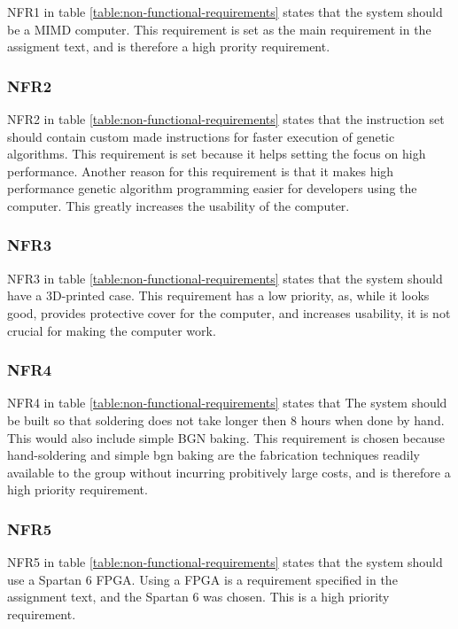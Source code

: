 NFR1 in table \vref{table:non-functional-requirements} states that the system should be a MIMD computer.
This requirement is set as the main requirement in the assigment text, and is therefore a high prority requirement.

\subsubsection{NFR2}

NFR2 in table \vref{table:non-functional-requirements} states that the instruction set should contain custom made instructions for faster execution of genetic algorithms.
This requirement is set because it helps setting the focus on high performance.
Another reason for this requirement is that it makes high performance genetic algorithm programming easier for developers using the computer.
This greatly increases the usability of the computer.

\subsubsection{NFR3}

NFR3 in table \vref{table:non-functional-requirements} states that the system should have a 3D-printed case.
This requirement has a low priority, as, while it looks good, provides protective cover for the computer, and increases usability, it is not crucial for making the computer work.

\subsubsection{NFR4}

NFR4 in table \vref{table:non-functional-requirements} states that The system should be built so that soldering does not take longer then 8 hours when done by hand. This would also include simple BGN baking.
This requirement is chosen because hand-soldering and simple bgn baking are the fabrication techniques readily available to the group without incurring probitively large costs, and is therefore a high priority requirement.

\subsubsection{NFR5}

NFR5 in table \vref{table:non-functional-requirements} states that the system should use a Spartan 6 FPGA.
Using a FPGA is a requirement specified in the assignment text, and the Spartan 6 was chosen. This is a high priority requirement. 

